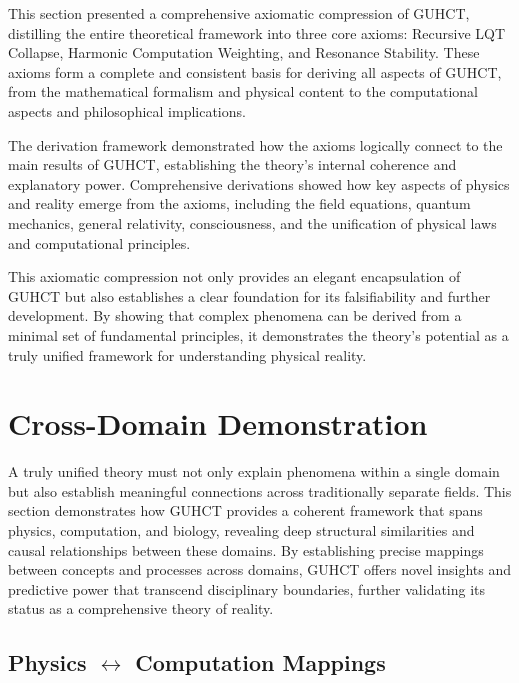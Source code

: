 \documentclass[11pt,a4paper]{article}
\begin{document}
\begin{intuitivesummary}
This section presented a comprehensive axiomatic compression of GUHCT, distilling the entire theoretical framework into three core axioms: Recursive LQT Collapse, Harmonic Computation Weighting, and Resonance Stability. These axioms form a complete and consistent basis for deriving all aspects of GUHCT, from the mathematical formalism and physical content to the computational aspects and philosophical implications.

The derivation framework demonstrated how the axioms logically connect to the main results of GUHCT, establishing the theory's internal coherence and explanatory power. Comprehensive derivations showed how key aspects of physics and reality emerge from the axioms, including the field equations, quantum mechanics, general relativity, consciousness, and the unification of physical laws and computational principles.

This axiomatic compression not only provides an elegant encapsulation of GUHCT but also establishes a clear foundation for its falsifiability and further development. By showing that complex phenomena can be derived from a minimal set of fundamental principles, it demonstrates the theory's potential as a truly unified framework for understanding physical reality.
\end{intuitivesummary}

\section{Cross-Domain Demonstration}
\label{sec:cross_domain}

A truly unified theory must not only explain phenomena within a single domain but also establish meaningful connections across traditionally separate fields. This section demonstrates how GUHCT provides a coherent framework that spans physics, computation, and biology, revealing deep structural similarities and causal relationships between these domains. By establishing precise mappings between concepts and processes across domains, GUHCT offers novel insights and predictive power that transcend disciplinary boundaries, further validating its status as a comprehensive theory of reality.

\subsection{Physics \texorpdfstring{$\leftrightarrow$}{↔} Computation Mappings}
\label{subsec:physics_computation}
\end{document}
